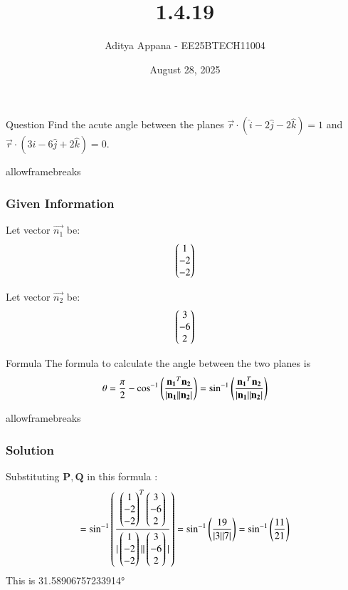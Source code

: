 \documentclass{beamer}
\title %
{1.4.19}
\date{August 28, 2025}
\author %
{Aditya Appana - EE25BTECH11004}
\begin{document}
\frame{\titlepage}
\begin{frame}{Question}
Find the acute angle between the planes $ \vec{r} \cdot (\hat{i} - 2\hat{j} - 2\hat{k} ) = 1$ and  $ \vec{r} \cdot (3\hat{i} - 6\hat{j} + 2\hat{k})=0$.

\end{frame}
\begin{frame}{allowframebreaks}
\frametitle{Given Information}

    \centering
    
    \label{tab:parameters}
    
    
    Let vector $\vec{n_1}$ be: \begin{align}
    \myvec{1\\-2\\-2}
    \end{align}
    

    Let vector $\vec{n_2}$ be: \begin{align}\myvec{3\\-6\\2}\end{align}
    \label{0.2}

   
\end{frame}


\begin{frame}{Formula}
The formula to calculate the angle between the two planes is
\begin{align}
\theta = \frac{\pi}{2} - \cos^{-1}\brak{\frac{\vec{n_1}^T\vec{n_2}}{|\vec{n_1}||\vec{n_2}|}}
= \sin^{-1}\brak{\frac{\vec{n_1}^T\vec{n_2}}{|\vec{n_1}||\vec{n_2}|}}
\end{align}



\end{frame}

\begin{frame}{allowframebreaks}
\frametitle{Solution}
Substituting $\mathbf{P, Q}$ in this formula :
\begin{align*}
= \sin^{-1}\brak{\frac{\myvec{1\\-2\\-2}^T\myvec{3\\-6\\2}}{|\myvec{1\\-2\\-2}||\myvec{3\\-6\\2}|}}
= \sin^{-1}\brak{\frac{19}{|3||7|}}
= \sin^{-1}\brak{\frac{11}{21}}
\end{align*}
\centering
This is 31.58906757233914°
\end{frame}
\end{document}
